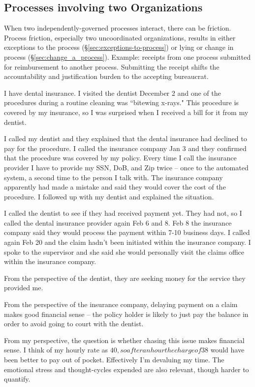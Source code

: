 \subsection{Processes involving two Organizations}

When two independently-governed processes interact, there can be friction. Process friction, especially two uncoordinated organizations, results in either exceptions to the process (\S\ref{sec:exceptions-to-process}) or lying or change in process (\S\ref{sec:change_a_process}). 
Example: receipts from one process submitted for reimbursement to another process.
Submitting the receipt shifts the accountability and justification burden to the accepting bureaucrat.




I have dental insurance. I visited the dentist December 2 and one of the procedures during a routine cleaning was ``bitewing x-rays." This procedure is covered by my insurance, so I was surprised when I received a bill for it from my dentist.

I called my dentist and they explained that the dental insurance had declined to pay for the procedure. I called the insurance company Jan 3 and they confirmed that the procedure was covered by my policy. 
Every time I call the insurance provider I have to provide my SSN, DoB, and Zip twice -- once to the automated system, a second time to the person I talk with. The insurance company apparently had made a mistake and said they would cover the cost of the procedure. I followed up with my dentist and explained the situation.

I called the dentist to see if they had received payment yet. They had not, so I called the dental insurance provider again Feb 6 and 8. Feb 8 the insurance company said they would process the payment within 7-10 business days. I called again Feb 20 and the claim hadn't been initiated within the insurance company. I spoke to the supervisor and she said she would personally visit the claims office within the insurance company.

From the perspective of the dentist, they are seeking money for the service they provided me.

From the perspective of the insurance company, delaying payment on a claim makes good financial sense -- the policy holder is likely to just pay the balance in order to avoid going to court with the dentist.

From my perspective, the question is whether chasing this issue makes financial sense. I think of my hourly rate as $40, so after an hour the charge of $38 would have been better to pay out of pocket. Effectively I'm devaluing my time. The emotional stress and thought-cycles expended are also relevant, though harder to quantify.
